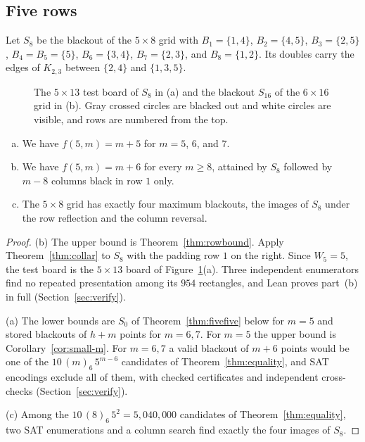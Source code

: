 \subsection{Five rows}

Let $S_8$ be the blackout of the $5\times8$ grid with $B_1=\{1,4\}$, $B_2=\{4,5\}$,
$B_3=\{2,5\}$, $B_4=B_5=\{5\}$, $B_6=\{3,4\}$, $B_7=\{2,3\}$, and $B_8=\{1,2\}$. Its
doubles carry the edges of $K_{2,3}$ between $\{2,4\}$ and $\{1,3,5\}$.

\begin{figure}[htbp]
\centering

\par\medskip

\caption{The $5\times13$ test board of $S_8$ in (a) and the blackout $S_{16}$ of the $6\times16$ grid in (b). Gray crossed circles are blacked out and white circles are visible, and rows are numbered from the top.}
\label{fig:boards}
\end{figure}

\begin{theorem}\label{thm:fiverow}
\begin{enumerate}[(a)]
\item We have $f(5,m)=m+5$ for $m=5$, $6$, and $7$.
\item We have $f(5,m)=m+6$ for every $m\ge8$, attained by $S_8$ followed by $m-8$ columns black in
row $1$ only.
\item The $5\times8$ grid has exactly four maximum blackouts, the images of $S_8$ under the row
reflection and the column reversal.
\end{enumerate}
\end{theorem}

\begin{proof}
(b) The upper bound is Theorem~\ref{thm:rowbound}. Apply Theorem~\ref{thm:collar} to $S_8$
with the padding row $1$ on the right. Since $W_5=5$, the test board is the $5\times13$
board of Figure~\ref{fig:boards}(a). Three independent enumerators find no repeated
presentation among its $954$ rectangles, and Lean proves part~(b) in full
(Section~\ref{sec:verify}).

(a) The lower bounds are $S_0$ of Theorem~\ref{thm:fivefive} below for $m=5$ and stored
blackouts of $h+m$ points for $m=6,7$. For $m=5$ the upper bound is
Corollary~\ref{cor:small-m}. For $m=6,7$ a valid blackout of $m+6$ points would be one of the
$10\,(m)_6\,5^{m-6}$ candidates of Theorem~\ref{thm:equality}, and SAT encodings exclude all of
them, with checked certificates and independent cross-checks (Section~\ref{sec:verify}).

(c) Among the $10\,(8)_6\,5^2=5{,}040{,}000$ candidates of Theorem~\ref{thm:equality}, two
SAT enumerations and a column search find exactly the four images of $S_8$.
\end{proof}
